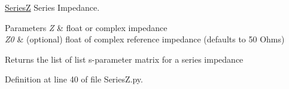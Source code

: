 \hyperlink{namespaceSignalIntegrity_1_1Devices_1_1SeriesZ}{SeriesZ} Series Impedance. 


\begin{DoxyParams}{Parameters}
{\em Z} & float or complex impedance \\
\hline
{\em Z0} & (optional) float of complex reference impedance (defaults to 50 Ohms) \\
\hline
\end{DoxyParams}
\begin{DoxyReturn}{Returns}
the list of list s-\/parameter matrix for a series impedance 
\end{DoxyReturn}


Definition at line 40 of file Series\+Z.\+py.

